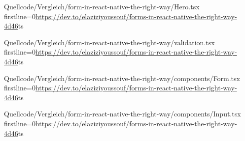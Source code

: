 \begin{fremdeslisting}{}{}
  {Quellcode/Vergleich/form-in-react-native-the-right-way/Hero.tsx}
  {firstline=0}{\url{https://dev.to/elaziziyoussouf/forms-in-react-native-the-right-way-4d46}}{ts}
  \label{lst:Schritt1KlasseLetzterStatus}
\end{fremdeslisting}

\begin{fremdeslisting}{}{}
  {Quellcode/Vergleich/form-in-react-native-the-right-way/validation.tsx}
  {firstline=0}{\url{https://dev.to/elaziziyoussouf/forms-in-react-native-the-right-way-4d46}}{ts}
  \label{lst:Schritt1KlasseLetzterStatus}
\end{fremdeslisting}
 
\begin{fremdeslisting}{}{}
  {Quellcode/Vergleich/form-in-react-native-the-right-way/components/Form.tsx}
  {firstline=0}{\url{https://dev.to/elaziziyoussouf/forms-in-react-native-the-right-way-4d46}}{ts}
  \label{lst:Schritt1KlasseLetzterStatus}
\end{fremdeslisting}

\begin{fremdeslisting}{}{}
  {Quellcode/Vergleich/form-in-react-native-the-right-way/components/Input.tsx}
  {firstline=0}{\url{https://dev.to/elaziziyoussouf/forms-in-react-native-the-right-way-4d46}}{ts}
  \label{lst:Schritt1KlasseLetzterStatus}
\end{fremdeslisting}
 